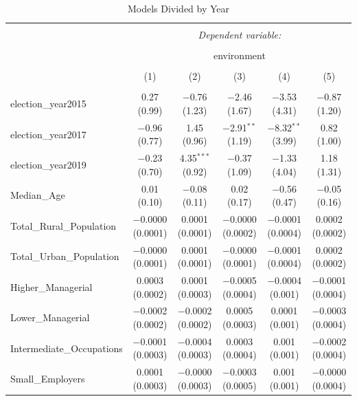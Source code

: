 \documentclass[12pt,letterpaper]{article}
\begin{document}
\begin{table}[!htbp] \centering 
	\caption{Models Divided by Year} 
	\label{} 
	\footnotesize 
	\begin{adjustbox}{width=\textwidth}
		\begin{tabular}{@{\extracolsep{5pt}}lccccc} 
			\\[-1.8ex]\hline 
			\hline \\[-1.8ex] 
			& \multicolumn{5}{c}{\textit{Dependent variable:}} \\ 
			\cline{2-6} 
			\\[-1.8ex] & \multicolumn{5}{c}{environment} \\ 
			\\[-1.8ex] & (1) & (2) & (3) & (4) & (5)\\ 
			\hline \\[-1.8ex] 
			election\_year2015 & 0.27 (0.99) & $-$0.76 (1.23) & $-$2.46 (1.67) & $-$3.53 (4.31) & $-$0.87 (1.20) \\ 
			election\_year2017 & $-$0.96 (0.77) & 1.45 (0.96) & $-$2.91$^{**}$ (1.19) & $-$8.32$^{**}$ (3.99) & 0.82 (1.00) \\ 
			election\_year2019 & $-$0.23 (0.70) & 4.35$^{***}$ (0.92) & $-$0.37 (1.09) & $-$1.33 (4.04) & 1.18 (1.31) \\ 
			Median\_Age & 0.01 (0.10) & $-$0.08 (0.11) & 0.02 (0.17) & $-$0.56 (0.47) & $-$0.05 (0.16) \\ 
			Total\_Rural\_Population & $-$0.0000 (0.0001) & 0.0001 (0.0001) & $-$0.0000 (0.0002) & $-$0.0001 (0.0004) & 0.0002 (0.0002) \\ 
			Total\_Urban\_Population & $-$0.0000 (0.0001) & 0.0001 (0.0001) & $-$0.0000 (0.0001) & $-$0.0001 (0.0004) & 0.0002 (0.0002) \\ 
			Higher\_Managerial & 0.0003 (0.0002) & 0.0001 (0.0003) & $-$0.0005 (0.0004) & $-$0.0004 (0.001) & $-$0.0001 (0.0004) \\ 
			Lower\_Managerial & $-$0.0002 (0.0002) & $-$0.0002 (0.0002) & 0.0005 (0.0003) & 0.0001 (0.001) & $-$0.0003 (0.0004) \\ 
			Intermediate\_Occupations & $-$0.0001 (0.0003) & $-$0.0004 (0.0003) & 0.0003 (0.0004) & 0.001 (0.001) & $-$0.0002 (0.0004) \\ 
			Small\_Employers & 0.0001 (0.0003) & $-$0.0000 (0.0003) & $-$0.0003 (0.0005) & 0.001 (0.001) & $-$0.0000 (0.0004) \\ 

\end{tabular}
\end{adjustbox}
\end{table}
\end{document}
